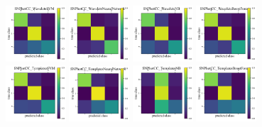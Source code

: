 \begin{figure}
	\begin{center}
		\includegraphics[width=0.2\textwidth]{./fig/SNPhotCC_WaveletsSVM_cm.png}
		\includegraphics[width=0.2\textwidth]{./fig/SNPhotCC_WaveletsNeuralNetwork_cm.png}
		\includegraphics[width=0.2\textwidth]{./fig/SNPhotCC_WaveletsNB_cm.png}
		\includegraphics[width=0.2\textwidth]{./fig/SNPhotCC_WaveletsBoostForest_cm.png}\\
		\includegraphics[width=0.2\textwidth]{./fig/SNPhotCC_TemplatesSVM_cm.png}
		\includegraphics[width=0.2\textwidth]{./fig/SNPhotCC_TemplatesNeuralNetwork_cm.png}
		\includegraphics[width=0.2\textwidth]{./fig/SNPhotCC_TemplatesNB_cm.png}
		\includegraphics[width=0.2\textwidth]{./fig/SNPhotCC_TemplatesBoostForest_cm.png}
		\caption{}
		\label{fig:snphotcc_cm}
	\end{center}
\end{figure}

